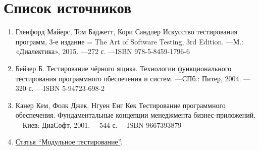 \documentclass[12pt]{article}
\begin{document}
    \section*{Список источников}
    \begin{enumerate}
        \item Гленфорд Майерс, Том Баджетт, Кори Сандлер Искусство тестирования программ, 3-е издание = The Art of Software Testing, 3rd Edition. —М.: «Диалектика», 2015. —272 с. —ISBN 978-5-8459-1796-6
        \item Бейзер Б. Тестирование чёрного ящика. Технологии функционального тестирования программного обеспечения и систем. —СПб.: Питер, 2004. —320 с. —ISBN 5-94723-698-2
        \item Канер Кем, Фолк Джек, Нгуен Енг Кек Тестирование программного обеспечения. Фундаментальные концепции менеджмента бизнес-приложений. —Киев: ДиаСофт, 2001. —544 с. —ISBN 9667393879
        \item \href{https://qalight.com.ua/baza-znaniy/modulnoe-testirovanie/}{Статья “Модульное тестирование”}.
    \end{enumerate}
\end{document}
